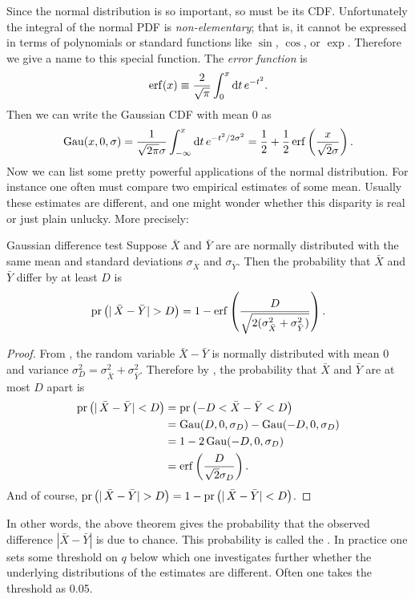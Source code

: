Since the normal distribution is so important, so must be its CDF.
Unfortunately the integral of the normal PDF is {\it non-elementary};
 that is, it cannot be expressed in terms of 
polynomials or standard
functions like $\sin$, $\cos$, or $\exp$. Therefore we give a name
to this special function.
The {\it error function} is
\begin{equation}
  \erf(x)\equiv\frac{2}{\sqrt{\pi}}\int_0^x\dd{t}e^{-t^2}.
\end{equation}
Then we can write the Gaussian CDF with mean 0 as
\begin{equation}
  \label{eq:gaussCDF}
  \Gau(x,0,\sigma)=\frac{1}{\sqrt{2\pi}\sigma}
                   \int_{-\infty}^x\dd{t}e^{-t^2/2\sigma^2}
                  =\frac{1}{2}+\frac{1}{2}
                   \erf\left(\frac{x}{\sqrt{2}\sigma}\right).
\end{equation}
Now we can list some pretty powerful applications of the normal distribution.
For instance one often must compare two empirical estimates of some mean.
Usually these estimates are different, and one might wonder whether this
disparity is real or just plain unlucky. More precisely:
\begin{theorem}{Gaussian difference test}{}\label{thm:gaudif}
  Suppose $\bar{X}$ and $\bar{Y}$ are are normally distributed with 
  the same mean and standard deviations $\sigma_{\bar{X}}$ and
  $\sigma_{\bar{Y}}$. Then the probability that $\bar{X}$ 
  and $\bar{Y}$ differ by at least $D$ is
  \begin{equation*}
    \pr{|\,\bar{X}-\bar{Y}|>D}=1-\erf\left(\frac{D}
       {\sqrt{2(\sigma_{\bar{X}}^2+\sigma_{\bar{Y}}^2)}}\right).
  \end{equation*}
  \begin{proof}
    From , the random variable
    $\bar{X}-\bar{Y}$ is normally distributed with mean 0 
    and variance $\sigma_D^2=\sigma_{\bar{X}}^2+\sigma_{\bar{Y}}^2$. Therefore by
    , the probability that $\bar{X}$ and 
    $\bar{Y}$ are at most $D$ apart is
    \begin{equation*}
      \begin{aligned}
        \pr{|\,\bar{X}-\bar{Y}|<D}
            &=\pr{-D<\bar{X}-\bar{Y}<D}\\
            &=\Gau(D,0,\sigma_D)-\Gau(-D,0,\sigma_D)\\
            &=1-2\Gau(-D,0,\sigma_D)\\
            &=\erf\left(\frac{D}{\sqrt{2}\sigma_D}\right).
      \end{aligned}
    \end{equation*}
    And of course, $\pr{|\,\bar{X}-\bar{Y}|>D}
     =1-\pr{|\,\bar{X}-\bar{Y}|<D}$.
  \end{proof}
\end{theorem}
In other words, the above theorem gives the probability that the
observed difference $|\bar{X}-\bar{Y}|$ is due to chance. This probability
is called the . In practice one sets some 
threshold on $q$ below which one investigates further whether the 
underlying distributions of the estimates are different. Often one 
takes the threshold as 0.05.


